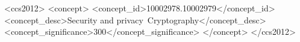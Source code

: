 \begin{CCSXML}
    <ccs2012>
    <concept>
    <concept_id>10002978.10002979</concept_id>
    <concept_desc>Security and privacy~Cryptography</concept_desc>
    <concept_significance>300</concept_significance>
    </concept>
    </ccs2012>
\end{CCSXML}


